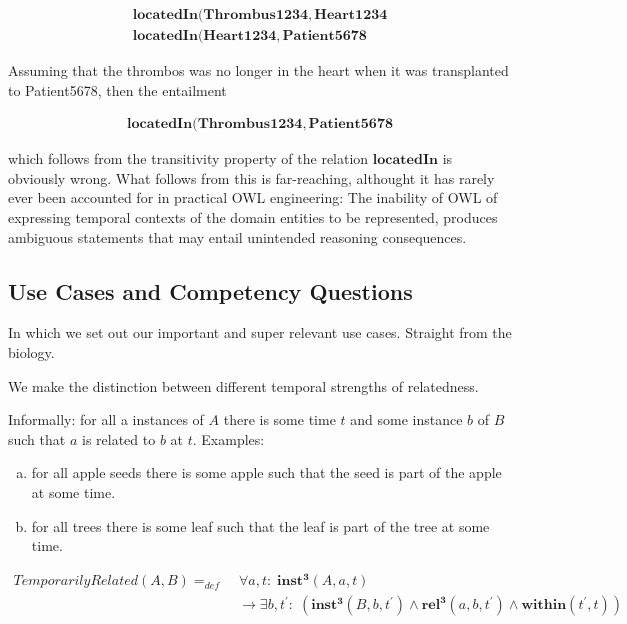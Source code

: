 \documentclass[10pt]{bmc_article}
\newcommand{\mirel}[1]{\ensuremath{\mathrm{\mathbf{#1}}}}
\newcommand{\mclass}[1]{\ensuremath{\mathit{#1}}}
\newcommand{\mrel}[2]{\mirel{#1^#2}}
\newcommand{\mrelt}[1]{\mrel{#1}{3}}
\newenvironment{bmcformat}{\baselineskip20pt\sloppy\setboolean{publ}{false}}{\baselineskip20pt\sloppy}
\begin{document}
\begin{bmcformat}
\begin{equation}
\begin{split}
\mirel{locatedIn} (\mirel{Thrombus1234}, \mirel{Heart1234}  \\
\mirel{locatedIn} (\mirel{Heart1234}, \mirel{Patient5678} 
\end{split}
\label{eq:trans}
\end{equation}

Assuming that the thrombos was no longer in the heart when it was transplanted to Patient5678, then the entailment

\begin{equation}
\begin{split}
\mirel{locatedIn} (\mirel{Thrombus1234}, \mirel{Patient5678} 
\end{split}
\label{eq:transEntailment}
\end{equation}

which follows from the transitivity property of the relation $\mirel{locatedIn}$ is obviously wrong. 
What follows from this is far-reaching, althought it has rarely ever been accounted for in practical OWL engineering: 
The inability of OWL of expressing temporal contexts of the domain entities to be represented, produces ambiguous statements that may entail unintended reasoning consequences. 

\subsection*{Use Cases and Competency Questions}

In which we set out our important and super relevant use cases. Straight from the biology. 

We make the distinction between different temporal strengths of relatedness. 


Informally: for all a instances of \mclass{A} there is some time $t$ and some instance $b$ of
\mclass{B} such that $a$ is related to $b$ at $t$. Examples: 
\begin{enumerate}[(a)]
\item for all apple seeds there is
some apple such that the seed is part of the apple at some time. 
\item for all
trees there is some leaf such that the leaf is part of the tree at some time.
\end{enumerate}

\begin{equation}
\begin{split}
\mclass{TemporarilyRelated}(\mclass{A},\mclass{B}) =_{def}&\;
\forall a, t:\; \mrelt{inst}(\mclass{A}, a, t) \\
&\ \rightarrow
\exists b, t^\prime:\;(\mrelt{inst}(\mclass{B},b,t^\prime) \wedge
\mrelt{rel}(a,b,t^\prime) \wedge \mirel{within}(t^\prime,t))
\end{split}
\label{eq:temporarily}
\end{equation}


\end{bmcformat}
\end{document}
